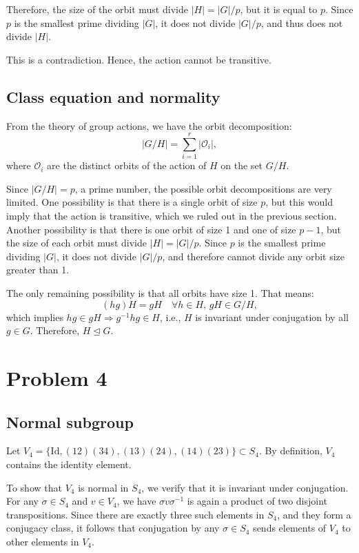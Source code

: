 \documentclass[12pt]{article}
\begin{document}
Therefore, the size of the orbit must divide \( |H| = |G|/p \), but it is equal to \( p \). Since \( p \) is the smallest prime dividing \( |G| \), it does not divide \( |G|/p \), and thus does not divide \( |H| \).

This is a contradiction. Hence, the action cannot be transitive.

\subsection*{Class equation and normality}

From the theory of group actions, we have the orbit decomposition:
\[
|G/H| = \sum_{i=1}^r |\mathcal{O}_i|,
\]
where \( \mathcal{O}_i \) are the distinct orbits of the action of \( H \) on the set \( G/H \).

Since \( |G/H| = p \), a prime number, the possible orbit decompositions are very limited. One possibility is that there is a single orbit of size \( p \), but this would imply that the action is transitive, which we ruled out in the previous section. Another possibility is that there is one orbit of size 1 and one of size \( p - 1 \), but the size of each orbit must divide \( |H| = |G|/p \). Since \( p \) is the smallest prime dividing \( |G| \), it does not divide \( |G|/p \), and therefore cannot divide any orbit size greater than 1.

The only remaining possibility is that all orbits have size 1. That means:
\[
(hg)H = gH \quad \forall h \in H,\, gH \in G/H,
\]
which implies \( hg \in gH \Rightarrow g^{-1}hg \in H \), i.e., \( H \) is invariant under conjugation by all \( g \in G \). Therefore, \( H \trianglelefteq G \).

\section*{Problem 4}
\subsection*{Normal subgroup}

Let \( V_4 = \{ \text{Id}, (12)(34), (13)(24), (14)(23) \} \subset S_4 \). By definition, \( V_4 \) contains the identity element. 

To show that \( V_4 \) is normal in \( S_4 \), we verify that it is invariant under conjugation. 
For any \( \sigma \in S_4 \) and \( v \in V_4 \), we have \( \sigma v \sigma^{-1} \) is again a product of two disjoint transpositions. 
Since there are exactly three such elements in \( S_4 \), and they form a conjugacy class, it follows that conjugation by any \( \sigma \in S_4 \) sends elements of \( V_4 \) to other elements in \( V_4 \).
\end{document}
